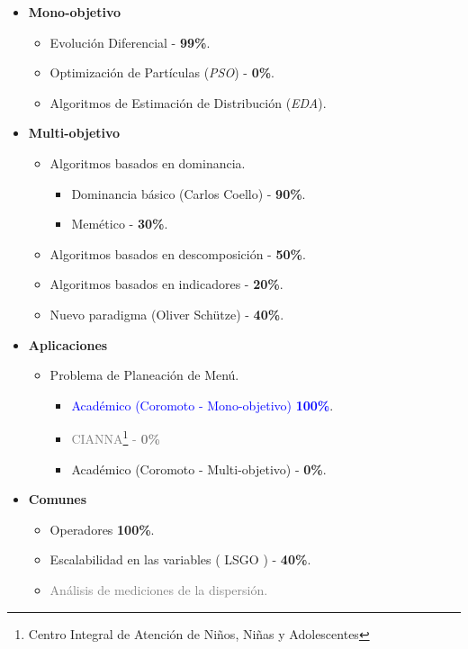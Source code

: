     \begin{itemize}
        \item \textbf{Mono-objetivo}
           \begin{itemize}
                \item { \color{blue} Evolución Diferencial - \textbf{99\%}}.
               \item Optimización de Partículas (\textit{PSO})  - \textbf{0\%}.
               \item { \color{gray}Algoritmos de Estimación de Distribución (\textit{EDA})}.
           \end{itemize}
        \item \textbf{Multi-objetivo}
        \begin{itemize}
            \item Algoritmos basados en dominancia.
            \begin{itemize}
                \item Dominancia básico (Carlos Coello) - \textbf{90\%}.
                \item Memético - \textbf{30\%}.
            \end{itemize}
            \item Algoritmos basados en descomposición - \textbf{50\%}.
            \item Algoritmos basados en indicadores - \textbf{20\%}.
            \item Nuevo paradigma (Oliver Schütze) - \textbf{40\%}.
        \end{itemize}
         \item \textbf{Aplicaciones}
         \begin{itemize}
             \item Problema de Planeación de Menú.
              \begin{itemize}
                  \item \textcolor{blue}{Académico (Coromoto - Mono-objetivo) \textbf{100\%}}.
                  \item \textcolor{gray}{CIANNA\footnote{Centro Integral de Atención de Niños, Niñas y Adolescentes} - \textbf{0\%}} 
                  \item Académico (Coromoto - Multi-objetivo) - \textbf{0\%}.
              \end{itemize} 
         \end{itemize}
          \item \textbf{Comunes}
          \begin{itemize}
              \item { \color{blue} Operadores \textbf{100\%}.}
              \item Escalabilidad en las variables ( LSGO ) - \textbf{40\%}.
              \item \textcolor{gray}{Análisis de mediciones de la dispersión.}
          \end{itemize}
    \end{itemize}
